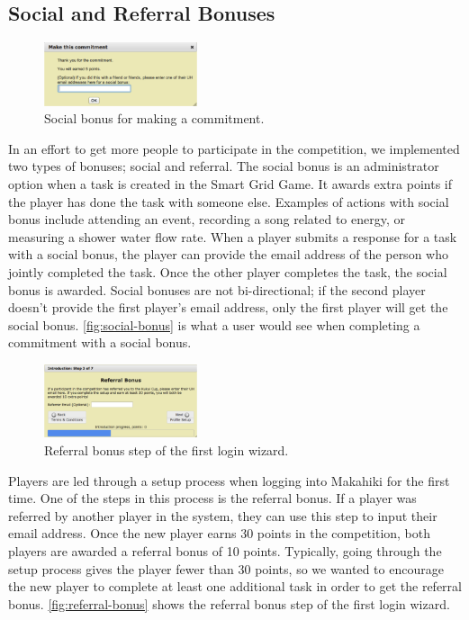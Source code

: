 \subsection{Social and Referral Bonuses}
\label{makahiki:components-bonuses}

\begin{figure}[h]
  \center
  \includegraphics[width=0.4\textwidth]{images/social-bonus.eps}
  \caption{Social bonus for making a commitment.}
  \label{fig:social-bonus}
\end{figure}

In an effort to get more people to participate in the competition, we implemented two types of bonuses; social and referral. The social bonus is an administrator option when a task is created in the Smart Grid Game. It awards extra points if the player has done the task with someone else. Examples of actions with social bonus include attending an event, recording a song related to energy, or measuring a shower water flow rate. When a player submits a response for a task with a social bonus, the player can provide the email address of the person who jointly completed the task. Once the other player completes the task, the social bonus is awarded. Social bonuses are not bi-directional; if the second player doesn't provide the first player's email address, only the first player will get the social bonus. \autoref{fig:social-bonus} is what a user would see when completing a commitment with a social bonus.

\begin{figure}[h]
  \center
  \includegraphics[width=0.4\textwidth]{images/referral-bonus.eps}
  \caption{Referral bonus step of the first login wizard.}
  \label{fig:referral-bonus}
\end{figure}

Players are led through a setup process when logging into Makahiki for the first time. One of the steps in this process is the referral bonus. If a player was referred by another player in the system, they can use this step to input their email address. Once the new player earns 30 points in the competition, both players are awarded a referral bonus of 10 points. Typically, going through the setup process gives the player fewer than 30 points, so we wanted to encourage the new player to complete at least one additional task in order to get the referral bonus. \autoref{fig:referral-bonus} shows the referral bonus step of the first login wizard.

